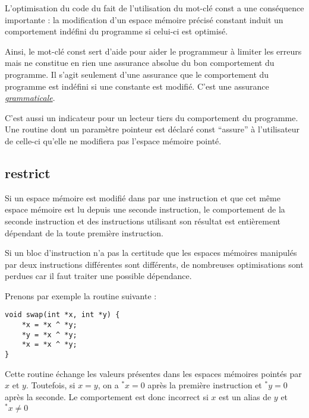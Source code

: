 \documentclass[../../../main.tex]{subfiles}
\begin{document}
L'optimisation du code du fait de l'utilisation du mot-clé \textsf{const} a une conséquence importante : la modification d'un espace mémoire précisé constant induit un comportement indéfini du programme si celui-ci est optimisé.

Ainsi, le mot-clé \textsf{const} sert d'aide pour aider le programmeur à limiter les erreurs mais ne constitue en rien une assurance absolue du bon comportement du programme. Il s'agit seulement d'une assurance que le comportement du programme est indéfini si une constante est modifié. C'est une assurance \underline{\textit{grammaticale}}.

C'est aussi un indicateur pour un lecteur tiers du comportement du programme. Une routine dont un paramètre pointeur est déclaré \textsf{const} ``assure'' à l'utilisateur de celle-ci qu'elle ne modifiera pas l'espace mémoire pointé.
\subsection{restrict}
\label{sub:restrict}
Si un espace mémoire est modifié dans par une instruction et que cet même espace mémoire est lu depuis une seconde instruction, le comportement de la seconde instruction et des instructions utilisant son résultat est entièrement dépendant de la toute première instruction.

Si un bloc d'instruction n'a pas la certitude que les espaces mémoires manipulés par deux instructions différentes sont différents, de nombreuses optimisations sont perdues car il faut traiter une possible dépendance.

Prenons par exemple la routine suivante :
\begin{verbatim}
void swap(int *x, int *y) {
	*x = *x ^ *y;
	*y = *x ^ *y;
	*x = *x ^ *y;
}
\end{verbatim}
Cette routine échange les valeurs présentes dans les espaces mémoires pointés par $x$ et $y$. Toutefois, si $x = y$, on a $^*x = 0$ après la première instruction et $^*y = 0$ après la seconde. Le comportement est donc incorrect si $x$ est un alias de $y$ et $^*x \neq 0$
\end{document}
